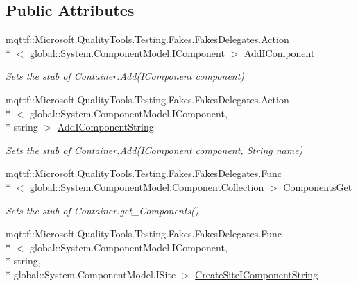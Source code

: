 \subsection*{Public Attributes}
\begin{DoxyCompactItemize}
\item 
mqttf\-::\-Microsoft.\-Quality\-Tools.\-Testing.\-Fakes.\-Fakes\-Delegates.\-Action\\*
$<$ global\-::\-System.\-Component\-Model.\-I\-Component $>$ \hyperlink{class_system_1_1_component_model_1_1_fakes_1_1_stub_nested_container_a3ff69c5f6a2aa7ee878f680b53fcbd4e}{Add\-I\-Component}
\begin{DoxyCompactList}\small\item\em Sets the stub of Container.\-Add(\-I\-Component component)\end{DoxyCompactList}\item 
mqttf\-::\-Microsoft.\-Quality\-Tools.\-Testing.\-Fakes.\-Fakes\-Delegates.\-Action\\*
$<$ global\-::\-System.\-Component\-Model.\-I\-Component, \\*
string $>$ \hyperlink{class_system_1_1_component_model_1_1_fakes_1_1_stub_nested_container_af0f463a7686d4eeadaa945219956b0a9}{Add\-I\-Component\-String}
\begin{DoxyCompactList}\small\item\em Sets the stub of Container.\-Add(\-I\-Component component, String name)\end{DoxyCompactList}\item 
mqttf\-::\-Microsoft.\-Quality\-Tools.\-Testing.\-Fakes.\-Fakes\-Delegates.\-Func\\*
$<$ global\-::\-System.\-Component\-Model.\-Component\-Collection $>$ \hyperlink{class_system_1_1_component_model_1_1_fakes_1_1_stub_nested_container_a6a77f4478de245c0b169f444a92d6e7d}{Components\-Get}
\begin{DoxyCompactList}\small\item\em Sets the stub of Container.\-get\-\_\-\-Components()\end{DoxyCompactList}\item 
mqttf\-::\-Microsoft.\-Quality\-Tools.\-Testing.\-Fakes.\-Fakes\-Delegates.\-Func\\*
$<$ global\-::\-System.\-Component\-Model.\-I\-Component, \\*
string, \\*
global\-::\-System.\-Component\-Model.\-I\-Site $>$ \hyperlink{class_system_1_1_component_model_1_1_fakes_1_1_stub_nested_container_a9295b22ff0765d38e7d59762196dad85}{Create\-Site\-I\-Component\-String}

\end{DoxyCompactItemize}
